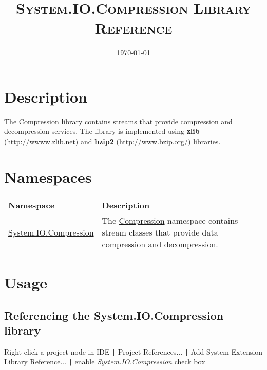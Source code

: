\documentclass[a4paper,oneside,11.000000pt]{book}
\begin{document}
\clearpage

\frontmatter
\title{\textsc{System.IO.Compression Library Reference}
}
\date{\today}
\maketitle
\tableofcontents

\clearpage
\chapter{Description}
\begin{flushleft}
The \hyperlink{System.IO.Compression}{Compression} library contains streams that provide compression and decompression services.
The library is implemented using \textbf{zlib} (\url{http://wwww.zlib.net}) and 
\textbf{bzip2} (\url{http://www.bzip.org/}) libraries.

\end{flushleft}
\chapter{Namespaces}
\begin{flushleft}
\begin{supertabular}[l]{!{\raggedright}p{5.49396cm}!{\raggedright}p{9.65604cm}}
\textbf{Namespace}
& \textbf{Description}
\\
\hline
\hyperlink{System.IO.Compression}{System.IO.Compression}
& The \hyperlink{System.IO.Compression}{Compression} namespace contains stream classes that provide data compression and decompression.

\\
\end{supertabular}

\end{flushleft}
\clearpage
\mainmatter

\chapter{Usage}

\section{Referencing the System.IO.Compression library}

Right-click a project node in IDE \verb.|. Project References... \verb.|.
Add System Extension Library Reference... \verb.|.
enable \emph{System.IO.Compression} check box
\end{document}
